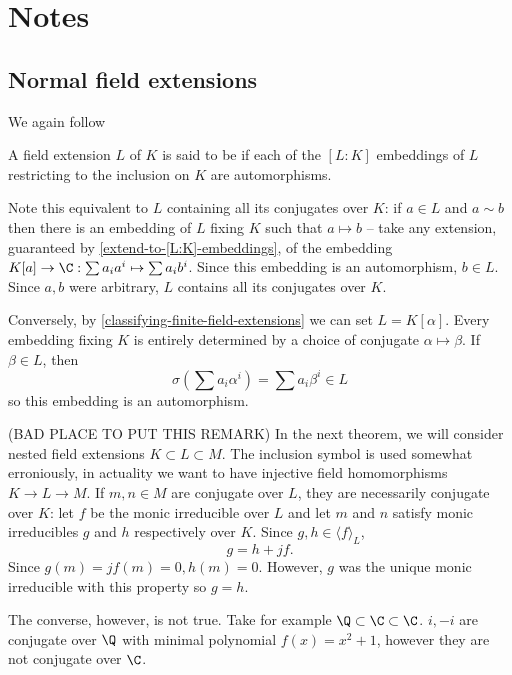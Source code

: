 

\section{Notes}

\subsection{Normal field extensions}
We again follow \cite{NumberFields}
\begin{definition}
A field extension $L$ of $K$ is said to be  if each of the $[L:K]$ embeddings of $L$ restricting to the inclusion on $K$ are automorphisms.
\end{definition}

Note this equivalent to $L$ containing all its conjugates over $K$: if $a\in L$ and $a\sim b$ then there is an embedding of $L$ fixing $K$ such that $a\mapsto b$ -- take any extension, guaranteed by \cref{extend-to-[L:K]-embeddings}, of the embedding $K[a]\rightarrow \C : \sum a_i a^i\mapsto \sum a_i b^i$. Since this embedding is an automorphism, $b\in L$. Since $a,b$ were arbitrary, $L$ contains all its conjugates over $K$. 

Conversely, by \cref{classifying-finite-field-extensions} we can set $L=K[\alpha]$. Every embedding fixing $K$ is entirely determined by a choice of conjugate $\alpha\mapsto \beta$. If $\beta \in L$, then $$\sigma(\sum a_i \alpha^i)=\sum a_i \beta^i\in L$$
so this embedding is an automorphism.


\begin{remark} (BAD PLACE TO PUT THIS REMARK)
In the next theorem, we will consider nested field extensions $K\subset L \subset M$. The inclusion symbol is used somewhat erroniously, in actuality we want to have injective field homomorphisms $K\rightarrow L \rightarrow M$. If $m,n\in M$ are conjugate over $L$, they are necessarily conjugate over $K$: let $f$ be the monic irreducible over $L$ and let $m$ and $n$ satisfy monic irreducibles $g$ and $h$ respectively over $K$. Since $g,h\in \langle f\rangle_L$, $$g=h+jf.$$
Since $g(m)=jf(m)=0, h(m)=0$. However, $g$ was the unique monic irreducible with this property so $g=h$.

The converse, however, is not true. Take for example $\Q\subset \C\subset \C$. $i,-i$ are conjugate over $\Q$ with minimal polynomial $f(x)=x^2+1$, however they are not conjugate over $\C$.
\end{remark}

